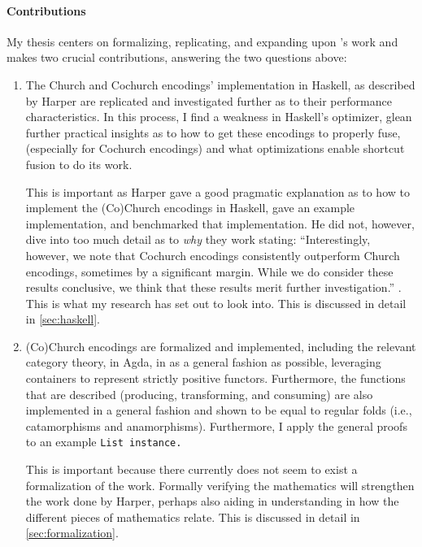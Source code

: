 \paragraph{Contributions}
My thesis centers on formalizing, replicating, and expanding upon \cite{Harper2011}'s work and makes two crucial contributions, answering the two questions above:
\begin{enumerate}
    \item The Church and Cochurch encodings' implementation in Haskell, as described by Harper are replicated and investigated further as to their performance characteristics.
    In this process, I find a weakness in Haskell's optimizer, glean further practical insights as to how to get these encodings to properly fuse, (especially for Cochurch encodings) and what optimizations enable shortcut fusion to do its work.

    This is important as Harper gave a good pragmatic explanation as to how to implement the (Co)Church encodings in Haskell, gave an example implementation, and benchmarked that implementation.
    He did not, however, dive into too much detail as to \textit{why} they work stating: ``Interestingly, however, we note that Cochurch encodings consistently outperform Church encodings, sometimes by a significant margin. While we do consider these results conclusive, we think that these results merit further investigation.'' \citep{Harper2011}.
    This is what my research has set out to look into.
    This is discussed in detail in \autoref{sec:haskell}.
    \item (Co)Church encodings are formalized and implemented, including the relevant category theory, in Agda, in as a general fashion as possible, leveraging containers \citep{Abbott2005} to represent strictly positive functors.
    Furthermore, the functions that are described (producing, transforming, and consuming) are also implemented in a general fashion and shown to be equal to regular folds (i.e., catamorphisms and anamorphisms).
    Furthermore, I apply the general proofs to an example \tt{List} instance.

    This is important because there currently does not seem to exist a formalization of the work.
    Formally verifying the mathematics will strengthen the work done by Harper, perhaps also aiding in understanding in how the different pieces of mathematics relate.
    This is discussed in detail in \autoref{sec:formalization}.
\end{enumerate}




